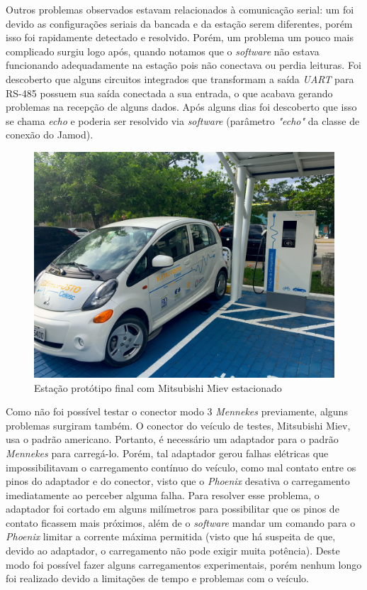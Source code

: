    Outros problemas observados estavam relacionados à comunicação serial: um foi devido as configurações seriais da bancada e da estação serem diferentes, porém isso foi rapidamente detectado e resolvido. Porém, um problema um pouco mais complicado surgiu logo após, quando notamos que o \textit{software} não estava funcionando adequadamente na estação pois não conectava ou perdia leituras. Foi descoberto que alguns circuitos integrados que transformam a saída \textit{\ac{UART}} para RS-485 possuem sua saída conectada a sua entrada, o que acabava gerando problemas na recepção de alguns dados. Após alguns dias foi descoberto que isso se chama \textit{echo} e poderia ser resolvido via \textit{software} (parâmetro \textit{"echo"} da classe de conexão do Jamod).

    \begin{figure}[H]
      \begin{center}
        \includegraphics[width=.75\textwidth,natwidth=4032,natheight=3024]{assets/images/evse.jpg}
        \caption{Estação protótipo final com Mitsubishi Miev estacionado}
        \label{fig:evse}
      \end{center}
    \end{figure}

    Como não foi possível testar o conector modo 3 \textit{Mennekes} previamente, alguns problemas surgiram também. O conector do veículo de testes, Mitsubishi Miev, usa o padrão americano. Portanto, é necessário um adaptador para o padrão \textit{Mennekes} para carregá-lo. Porém, tal adaptador gerou falhas elétricas que impossibilitavam o carregamento contínuo do veículo, como mal contato entre os pinos do adaptador e do conector, visto que o \textit{Phoenix} desativa o carregamento imediatamente ao perceber alguma falha. Para resolver esse problema, o adaptador foi cortado em alguns milímetros para possibilitar que os pinos de contato ficassem mais próximos, além de o \textit{software} mandar um comando para o \textit{Phoenix} limitar a corrente máxima permitida (visto que há suspeita de que, devido ao adaptador, o carregamento não pode exigir muita potência). Deste modo foi possível fazer alguns carregamentos experimentais, porém nenhum longo foi realizado devido a limitações de tempo e problemas com o veículo.

